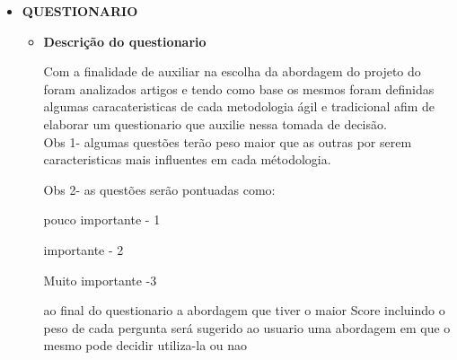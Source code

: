 \begin{itemize}\item \textbf{QUESTIONARIO}
\begin{itemize}
	\item \textbf{Descrição do questionario}
	
		Com a finalidade de auxiliar na escolha da abordagem do projeto do foram analizados artigos e tendo como base os mesmos foram   definidas algumas caracateristicas de cada metodologia ágil e tradicional afim de elaborar um questionario que auxilie nessa tomada de decisão.\\

	Obs 1- algumas questões terão peso maior que as outras por serem caracteristicas mais influentes em cada métodologia.
	

			Obs 2- as questões serão pontuadas como:


			pouco importante - 1

			importante       - 2
			
			Muito importante -3

	ao final do questionario a abordagem que tiver o maior Score incluindo o peso de cada pergunta será sugerido ao usuario uma abordagem em que o mesmo pode decidir utiliza-la ou nao
\end{itemize}
\end{itemize}

